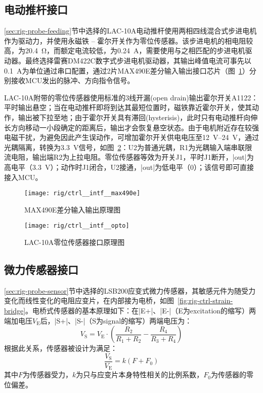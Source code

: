 \subsection{电动推杆接口}\label{sec:rig-ctrl-intf-stepper}

\ref{sec:rig-probe-feeding}节中选择的LAC-10A电动推杆使用两相四线混合式步进电机作为驱动力，并使用永磁铁 -- 霍尔开关作为零位传感器。该步进电机的相电阻较高，为\SI{20.4}{\ohm}，而额定电流较低，为\SI{0.24}{\ampere}，需要使用与之相匹配的步进电机驱动器。最终选择雷赛DM422C数字式步进电机驱动器，其输出峰值电流可事先以\SI{0.1}{\ampere}为单位通过串口配置，通过2片MAX490E差分输入输出接口芯片（图~\ref{fig:rig-ctrl-intf-max490e}）分别接收MCU发出的脉冲、方向指令信号。

LAC-10A附带的零位传感器使用标准的3线开漏(open drain)输出霍尔开关A1122：平时输出悬空；当在电动推杆即将到达其最短位置时，磁铁靠近霍尔开关，使其动作，输出被下拉至地；由于霍尔开关具有滞回(hysterisis)，此时只有电动推杆向伸长方向移动一小段确定的距离后，输出才会恢复悬空状态。由于电机附近存在较强电磁干扰，为避免因此产生误动作，可增加霍尔开关供电电压至\SIrange{12}{24}{\volt}\footnotemark{}，通过光耦隔离，转换为\SI{3.3}{\volt}信号，如图~\ref{fig:rig-ctrl-intf-opto}：U2为普通光耦，R1为光耦输入端串联限流电阻，输出端R2为上拉电阻。零位传感器等效为开关J1，平时J1断开，\bverb|out|为高电平（\SI{3.3}{\volt}）；动作时J1闭合，U2接通，\bverb|out|为低电平（0）；该信号即可直接接入MCU。


\begin{figure}[p]
\centering
\texttt{[image: rig/ctrl\_\_intf\_\_max490e]}
\caption{MAX490E差分输入输出原理图}
\label{fig:rig-ctrl-intf-max490e}
\end{figure}

\begin{figure}[p]
\centering
\texttt{[image: rig/ctrl\_\_intf\_\_opto]}
\caption{LAC-10A零位传感器接口原理图}
\label{fig:rig-ctrl-intf-opto}
\end{figure}

\subsection{微力传感器接口}\label{sec:rig-ctrl-intf-strain}

\ref{sec:rig-probe-sensor}节中选择的LSB200应变式微力传感器，其敏感元件为随受力变化而线性变化的电阻应变片，在内部接为电桥，如图~\ref{fig:rig-ctrl-strain-bridge}。电桥式传感器的基本原理如下：在\bverb|E+|、\bverb|E-|（E为excitation的缩写）两端加电压$V_{\mathrm{E}}$后，\bverb|S+|、\bverb|S-|（S为signal的缩写）两端电压为：
\[
V_{\mathrm{S}} = V_{\mathrm{E}} \cdot (\frac{R_2}{R_1 + R_2} - \frac{R_4}{R_3 + R_4})
\]
根据此关系，传感器被设计为满足：
\begin{equation}
\label{eq:rig-ctrl-intf-strain}
\frac{V_{\mathrm{S}}}{V_{\mathrm{E}}} = k (F + F_0)
\end{equation}
其中$F$为传感器受力，$k$为只与应变片本身特性相关的比例系数，$F_0$为传感器的零位偏差。

